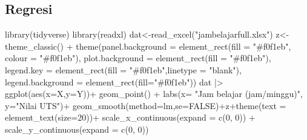 \documentclass[
  letterpaper,
  DIV=11,
  numbers=noendperiod]{scrartcl}
\newenvironment{Shaded}{\begin{snugshade}}{\end{snugshade}}
\newcommand{\AttributeTok}[1]{\textcolor[rgb]{0.40,0.45,0.13}{#1}}
\newcommand{\ConstantTok}[1]{\textcolor[rgb]{0.56,0.35,0.01}{#1}}
\newcommand{\DecValTok}[1]{\textcolor[rgb]{0.68,0.00,0.00}{#1}}
\newcommand{\FunctionTok}[1]{\textcolor[rgb]{0.28,0.35,0.67}{#1}}
\newcommand{\NormalTok}[1]{\textcolor[rgb]{0.00,0.23,0.31}{#1}}
\newcommand{\OtherTok}[1]{\textcolor[rgb]{0.00,0.23,0.31}{#1}}
\newcommand{\SpecialCharTok}[1]{\textcolor[rgb]{0.37,0.37,0.37}{#1}}
\newcommand{\StringTok}[1]{\textcolor[rgb]{0.13,0.47,0.30}{#1}}
\begin{document}
\hypertarget{regresi-1}{%
\subsection{Regresi}\label{regresi-1}}

\begin{Shaded}
\begin{Highlighting}[]
\FunctionTok{library}\NormalTok{(tidyverse)}
\FunctionTok{library}\NormalTok{(readxl)}
\NormalTok{dat}\OtherTok{\textless{}{-}}\FunctionTok{read\_excel}\NormalTok{(}\StringTok{"jambelajarfull.xlsx"}\NormalTok{)}
\NormalTok{z}\OtherTok{\textless{}{-}}\FunctionTok{theme\_classic}\NormalTok{() }\SpecialCharTok{+}
  \FunctionTok{theme}\NormalTok{(}\AttributeTok{panel.background =} \FunctionTok{element\_rect}\NormalTok{(}\AttributeTok{fill =} \StringTok{"\#f0f1eb"}\NormalTok{,}
                                        \AttributeTok{colour =} \StringTok{"\#f0f1eb"}\NormalTok{),}
        \AttributeTok{plot.background =} \FunctionTok{element\_rect}\NormalTok{(}\AttributeTok{fill =} \StringTok{"\#f0f1eb"}\NormalTok{),}
        \AttributeTok{legend.key =} \FunctionTok{element\_rect}\NormalTok{(}\AttributeTok{fill =} \StringTok{"\#f0f1eb"}\NormalTok{,}\AttributeTok{linetype =} \StringTok{"blank"}\NormalTok{),}
        \AttributeTok{legend.background =} \FunctionTok{element\_rect}\NormalTok{(}\AttributeTok{fill=}\StringTok{"\#f0f1eb"}\NormalTok{))}
\NormalTok{dat }\SpecialCharTok{|\textgreater{}} \FunctionTok{ggplot}\NormalTok{(}\FunctionTok{aes}\NormalTok{(}\AttributeTok{x=}\NormalTok{X,}\AttributeTok{y=}\NormalTok{Y))}\SpecialCharTok{+}
  \FunctionTok{geom\_point}\NormalTok{() }\SpecialCharTok{+}
  \FunctionTok{labs}\NormalTok{(}\AttributeTok{x=} \StringTok{"Jam belajar (jam/minggu)"}\NormalTok{, }\AttributeTok{y=}\StringTok{"Nilai UTS"}\NormalTok{)}\SpecialCharTok{+}
  \FunctionTok{geom\_smooth}\NormalTok{(}\AttributeTok{method=}\NormalTok{lm,}\AttributeTok{se=}\ConstantTok{FALSE}\NormalTok{)}\SpecialCharTok{+}\NormalTok{z}\SpecialCharTok{+}\FunctionTok{theme}\NormalTok{(}\AttributeTok{text =} \FunctionTok{element\_text}\NormalTok{(}\AttributeTok{size=}\DecValTok{20}\NormalTok{))}\SpecialCharTok{+}
  \FunctionTok{scale\_x\_continuous}\NormalTok{(}\AttributeTok{expand =} \FunctionTok{c}\NormalTok{(}\DecValTok{0}\NormalTok{, }\DecValTok{0}\NormalTok{)) }\SpecialCharTok{+} \FunctionTok{scale\_y\_continuous}\NormalTok{(}\AttributeTok{expand =} \FunctionTok{c}\NormalTok{(}\DecValTok{0}\NormalTok{, }\DecValTok{0}\NormalTok{))}
\end{Highlighting}
\end{Shaded}
\end{document}
